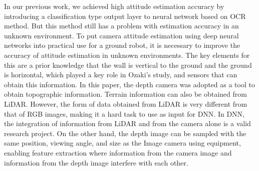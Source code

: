 
In our previous work, we achieved high attitude estimation accuracy by introducing a classification type output layer to neural network\cite{9708864} based on OCR method. But this method still has a problem with estimation accuracy in an unknown environment. To put camera attitude estimation using deep neural networks into practical use for a ground robot, it is necessary to improve the accuracy of attitude estimation in unknown environments. The key elements for this are a prior knowledge that the wall is vertical to the ground and the ground is horizontal, which played a key role in Ozaki's study\cite{ozaki_lidar_normal}, and sensors that can obtain this information. In this paper, the depth camera was adopted as a tool to obtain topographic information. Terrain information can also be obtained from LiDAR. However, the form of data obtained from LiDAR is very different from that of RGB images, making it a hard task to use as input for DNN\cite{ozaki_robosym}. In DNN, the integration of information from LiDAR and from the camera alone is a valid research project\cite{google_LiDAR_camera}. On the other hand, the depth image can be sampled with the same position, viewing angle, and size as the Image camera using equipment, enabling feature extraction where information from the camera image and information from the depth image interfere with each other.



